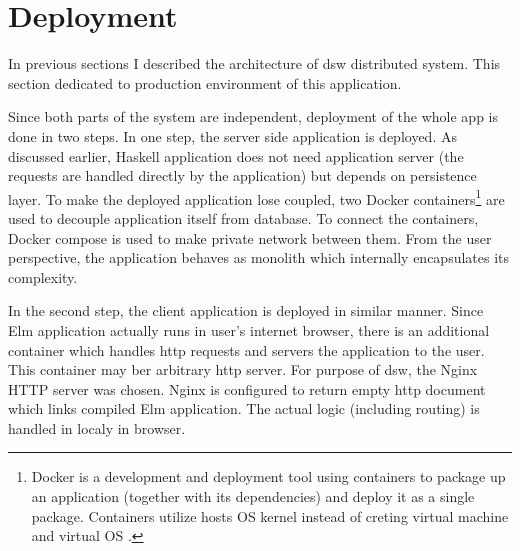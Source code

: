 \section{Deployment}

In previous sections I described the architecture of \gls{dsw} distributed system.
This section dedicated to production environment of this application.

Since both parts of the system are independent, deployment of the whole app is done in two steps.
In one step, the server side application is deployed.
As discussed earlier, Haskell application does not need application server (the requests are handled directly by the application) but depends on persistence layer.
To make the deployed application lose coupled, two Docker containers\footnote{Docker is a development and deployment tool using containers to package up an application (together with its dependencies) and deploy it as a single package. Containers utilize hosts OS kernel instead of creting virtual machine and virtual OS \cite{ms-docker}.} are used to decouple application itself from database.
To connect the containers, Docker compose is used to make private network between them.
From the user perspective, the application behaves as monolith which internally encapsulates its complexity.

In the second step, the client application is deployed in similar manner.
Since Elm application actually runs in user's internet browser, there is an additional container which handles \gls{http} requests and servers the application to the user.
This container may ber arbitrary \gls{http} server.
For purpose of \gls{dsw}, the Nginx HTTP server was chosen.
Nginx is configured to return empty \gls{http} document which links compiled Elm application.
The actual logic (including routing) is handled in localy in browser.

